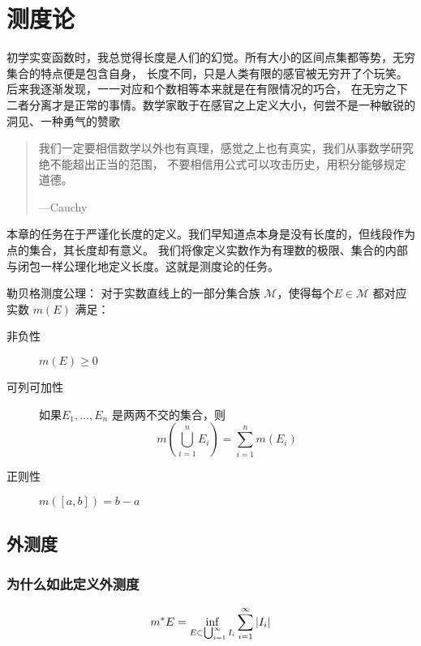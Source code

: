 \chapter{测度论}

初学实变函数时，我总觉得长度是人们的幻觉。所有大小的区间点集都等势，无穷集合的特点便是包含自身，
长度不同，只是人类有限的感官被无穷开了个玩笑。后来我逐渐发现，一一对应和个数相等本来就是在有限情况的巧合，
在无穷之下二者分离才是正常的事情。数学家敢于在感官之上定义大小，何尝不是一种敏锐的洞见、一种勇气的赞歌

\begin{quote}
    我们一定要相信数学以外也有真理，感觉之上也有真实，我们从事数学研究绝不能超出正当的范围，
    不要相信用公式可以攻击历史，用积分能够规定道德。

    \hfill ---Cauchy
\end{quote}

本章的任务在于严谨化长度的定义。我们早知道点本身是没有长度的，但线段作为点的集合，其长度却有意义。
我们将像定义实数作为有理数的极限、集合的内部与闭包一样公理化地定义长度。这就是测度论的任务。

\begin{definition}{}{}
    勒贝格测度公理： 对于实数直线上的一部分集合族 \(\mathscr{M}\)，使得每个\(E \in
    \mathscr{M}\) 都对应实数 \(m(E)\) 满足：
    \begin{description}
        \item[非负性] \(m(E) \geq 0\)
        \item[可列可加性] 如果\(E_1, \dots ,E_{n}\) 是两两不交的集合，则
            \[
                m\left(\bigcup_{i=1}^{n} E_i\right) =
                \sum_{i=1}^{n} m(E_i)
            \]
        \item[正则性] \(m([a,b])=b-a\)
    \end{description}
\end{definition}

\section{外测度}
\subsection{为什么如此定义外测度}

\begin{definition}{}{}
    \[
        m^{*} E=\inf_{E\subset \bigcup_{i=1}^{\infty} I_{i}}
        \sum_{i=1}^{\infty} \left|I_{i}\right|
    \]
\end{definition}

